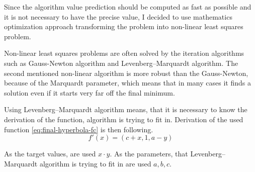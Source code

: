 Since the algorithm value prediction should be computed as fast as possible
and it is not necessary to have the precise value,
I decided to use mathematics optimization approach transforming the problem into non-linear least squares problem.

Non-linear least squares problems are often solved by the iteration algorithms 
such as Gauss-Newton algorithm\cite{gratton2007approximate} and Levenberg–Marquardt algorithm\cite{marquardt1963algorithm}.
The second mentioned non-linear algorithm is more robust than the Gauss-Newton, 
because of the Marquardt parameter\cite{marquardt1963algorithm},
which means that in many cases it finds a solution even if it starts very far off the final minimum.

Using Levenberg–Marquardt algorithm means, 
that it is necessary to know the derivation of the function, 
algorithm is trying to fit in.
Derivation of the used function \ref{eq:final-hyperbola-fc} is then following.
\begin{equation}\label{eq:final-hyperbola-fd}
    f'(x) = (c+x, 1, a-y)
\end{equation}

As the target values, are used $x \cdot y$.
As the parameters, that Levenberg–Marquardt algorithm is trying to fit in are used $a,b,c$.